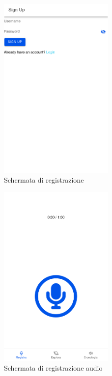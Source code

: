 \documentclass[a4paper]{article}
\begin{document}
\begin{figure}[h]
	\centering
	\includegraphics[width=0.5\textwidth]{signup.png}
	\caption{Schermata di registrazione}
\end{figure}

\begin{figure}[h]
	\centering
	\includegraphics[width=0.5\textwidth]{./record.png}
	\caption{Schermata di registrazione audio}
\end{figure}
\end{document}
